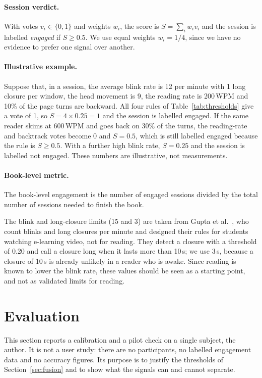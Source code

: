 \documentclass[sigconf,nonacm]{acmart}
\begin{document}
\paragraph{Session verdict.}
With votes $v_i \in \{0,1\}$ and weights $w_i$, the score is $S = \sum_i w_i v_i$ and the session is labelled
\emph{engaged} if $S \ge 0.5$. We use equal weights $w_i = 1/4$, since we have no evidence to prefer one signal over
another.

\paragraph{Illustrative example.}
Suppose that, in a session, the average blink rate is 12 per minute with 1 long closure per window, the head movement is 9,
the reading rate is 200\,WPM and 10\% of the page turns are backward. All four rules of Table~\ref{tab:thresholds} give
a vote of 1, so $S = 4 \times 0.25 = 1$ and the session is labelled engaged. If the same reader skims at 600\,WPM and
goes back on 30\% of the turns, the reading-rate and backtrack votes become 0 and $S = 0.5$, which is still
labelled engaged because the rule is $S \ge 0.5$. With a further high blink rate, $S = 0.25$ and the session is labelled not engaged.
These numbers are illustrative, not measurements.

\paragraph{Book-level metric.}
The book-level engagement is the number of engaged sessions divided by the total number of sessions needed to finish
the book.

The blink and long-closure limits (15 and 3) are taken from Gupta et al.~\cite{gupta2023multimodal}, who count blinks and
long closures per minute and designed their rules for students watching e-learning video, not for reading. They detect a
closure with a threshold of 0.20 and call a closure long when it lasts more than 10\,s; we use 3\,s, because a
closure of 10\,s is already unlikely in a reader who is awake. Since reading is known to lower the blink rate, these values
should be seen as a starting point, and not as validated limits for reading.

\section{Evaluation}\label{sec:eval}
This section reports a calibration and a pilot check on a single subject, the author. It is not a user study: there are
no participants, no labelled engagement data and no accuracy figures. Its purpose is to justify the thresholds of
Section~\ref{sec:fusion} and to show what the signals can and cannot separate.
\end{document}
